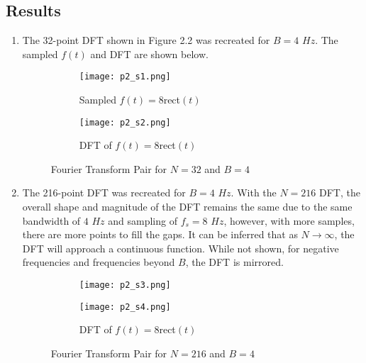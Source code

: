 \documentclass{article}
\begin{document}
\subsection{Results}
\begin{enumerate}
    \item The 32-point DFT shown in Figure 2.2 was recreated for $B=4$ $Hz$. The sampled $f(t)$ and DFT are shown below. 

    \begin{figure}[h]
        \centering
        \begin{subfigure}{.5\textwidth}
          \centering
          \texttt{[image: p2\_s1.png]}
          \caption{Sampled $f(t)=8$rect$(t)$}
          \label{fig:sub1}
        \end{subfigure}%
        \begin{subfigure}{.5\textwidth}
          \centering
          \texttt{[image: p2\_s2.png]}
          \caption{DFT of $f(t)=8$rect$(t)$}
          \label{fig:sub2}
        \end{subfigure}
        \caption{Fourier Transform Pair for $N=32$ and $B=4$}
        \label{fig:test}
    \end{figure}

    \item The 216-point DFT was recreated for $B=4$ $Hz$. With the $N=216$ DFT, the overall shape and magnitude of the DFT remains the same due to the same bandwidth of $4$ $Hz$ and sampling of $f_s=8$ $Hz$, however, with more samples, there are more points to fill the gaps. It can be inferred that as $N \rightarrow \infty$, the DFT will approach a continuous function. While not shown, for negative frequencies and frequencies beyond $B$, the DFT is mirrored.
    
    \begin{figure}[h]
        \centering
        \begin{subfigure}{.5\textwidth}
          \centering
          \texttt{[image: p2\_s3.png]}
          \caption{}
          \label{fig:sub1}
        \end{subfigure}%
        \begin{subfigure}{.5\textwidth}
          \centering
          \texttt{[image: p2\_s4.png]}
          \caption{DFT of $f(t)=8$rect$(t)$}
          \label{fig:sub2}
        \end{subfigure}
        \caption{Fourier Transform Pair for $N=216$ and $B=4$}
        \label{fig:test}
    \end{figure}


\end{enumerate}
\end{document}
